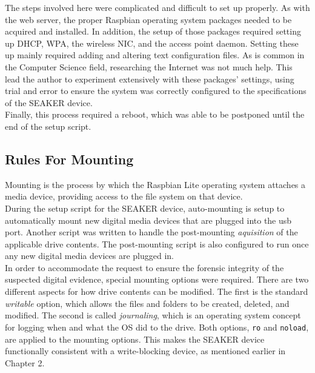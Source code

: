 \documentclass[12pt]{article}
\begin{document}
The steps involved here were complicated and difficult to set up properly.  As
with the web server, the proper Raspbian operating system packages needed to be
acquired and installed.  In addition, the setup of those packages required 
setting up DHCP, WPA, the wireless NIC, and the access point daemon.  Setting
these up mainly required adding and altering text configuration files.  
As is common in the Computer Science field, researching the Internet was not
much help.  This lead the author to experiment extensively with these packages'
settings, using trial and error to ensure the system was correctly configured
to the specifications of the SEAKER device.\\

Finally, this process required a reboot, which was able to be postponed until
the end of the setup script.\\

\subsection{Rules For Mounting}

Mounting is the process by which the Raspbian Lite operating system attaches
a media device, providing access to the file system on that device.\\

During the setup script for the SEAKER device, auto-mounting is setup to
automatically mount new digital media devices that are plugged into the \gls{usb}
port.  Another script was written to handle the post-mounting {\em aquisition}
of the applicable drive contents.  The post-mounting script is also
configured to run once any new digital media devices are plugged in.\\

In order to accommodate the request to ensure the forensic integrity of the
suspected digital evidence, special mounting options were required.  There
are two different aspects for how drive contents can be modified.  The first is
the standard {\em writable} option, which allows the  files and folders to be
created, deleted, and modified.  The second is called {\em journaling},
which is an operating system concept for logging when and what the OS 
did to the drive.  Both options, \verb|ro| and \verb|noload|, are applied to
the mounting options.  This makes the SEAKER device functionally consistent
with a write-blocking device, as mentioned earlier in Chapter 2.\\
\end{document}
